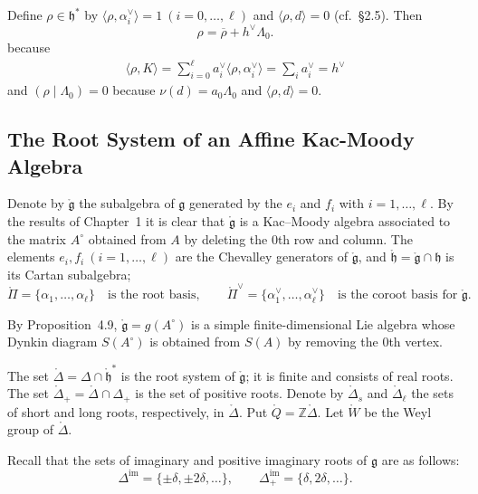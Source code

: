 \documentclass[12pt]{article}
\begin{document}
Define $\rho \in \mathfrak{h}^*$ by $\langle \rho, \alpha_i^\vee \rangle = 1 \ (i=0,\dots,\ell)$ and $\langle \rho, d \rangle = 0$ (cf.\ §2.5).
Then
\begin{equation}
    \rho = \overline{\rho} + h^\vee \Lambda_0.
\end{equation} because \begin{align*}
    \langle \rho, K \rangle = \sum_{i=0}^\ell a_i^\vee \langle \rho, \alpha_i^\vee \rangle = \sum_i a_i^\vee = h^\vee
\end{align*} and $(\rho \mid \Lambda_0) = 0$ because $\nu(d) = a_0 \Lambda_0$ and $\langle \rho, d \rangle = 0$.
\subsection{The Root System of an Affine Kac-Moody Algebra}
Denote by $\mathring{\mathfrak{g}}$ the subalgebra of $\mathfrak{g}$ generated by the $e_i$ and $f_i$ with $i=1,\dots,\ell$. By the results of Chapter~1 it is clear that $\mathring{\mathfrak{g}}$ is a Kac--Moody algebra associated to the matrix $A^{\circ}$ obtained from $A$ by deleting the $0$th row and column. The elements $e_i,f_i \ (i=1,\dots,\ell)$ are the Chevalley generators of $\mathring{\mathfrak{g}}$, and $\mathring{\mathfrak{h}}=\mathring{\mathfrak{g}}\cap \mathfrak{h}$ is its Cartan subalgebra;
\[
    \mathring{\Pi}=\{\alpha_1,\dots,\alpha_\ell\} \quad\text{is the root basis}, \qquad
    \mathring{\Pi}^\vee=\{\alpha_1^\vee,\dots,\alpha_\ell^\vee\}\quad\text{is the coroot basis for }\mathring{\mathfrak{g}}.
\]

\medskip

\noindent By Proposition~4.9, $\mathring{\mathfrak{g}}=g(A^\circ)$ is a simple finite-dimensional Lie algebra whose Dynkin diagram $S(A^\circ)$ is obtained from $S(A)$ by removing the $0$th vertex.

The set $\mathring{\Delta}=\Delta \cap \mathring{\mathfrak{h}}^*$ is the root system of $\mathring{\mathfrak{g}}$; it is finite and consists of real roots. The set $\mathring{\Delta}_+ = \mathring{\Delta} \cap \Delta_+$ is the set of positive roots. Denote by $\mathring{\Delta}_s$ and $\mathring{\Delta}_\ell$ the sets of short and long roots, respectively, in $\mathring{\Delta}$. Put $\mathring{Q} = \mathbb{Z}\mathring{\Delta}$. Let $\mathring{W}$ be the Weyl group of $\mathring{\Delta}$.

Recall that the sets of imaginary and positive imaginary roots of $\mathfrak{g}$ are as follows:
\[
    \Delta^{\mathrm{im}} = \{\pm \delta, \pm 2\delta, \dots \},
    \qquad
    \Delta^{\mathrm{im}}_+ = \{\delta, 2\delta, \dots\}.
\]
\end{document}
